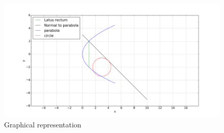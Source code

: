 \documentclass{beamer}
\begin{document}
 \begin{frame}
     \begin{figure}

\includegraphics[scale=0.27]{fig1.png}
\caption{Graphical representation}
\end{figure}
 \end{frame}
\end{document}
